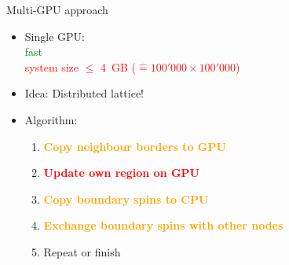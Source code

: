 \documentclass{beamer}
\begin{document}
\begin{frame}{Multi-GPU approach}
\begin{itemize}
    \item Single GPU:\\
        \textcolor{green}{fast}\\ \pause
        \textcolor{red}{system size $\le$ 4~GB ($\mathrel{\widehat{=}} 100'000 \times 100'000$)} \pause
    \item Idea: Distributed lattice! \pause
    \item Algorithm:
        \begin{enumerate}
            \item \textcolor{orange}{\textbf{Copy neighbour borders to GPU}} \pause
            \item \textcolor{red}{\textbf{Update own region on GPU}} \pause
            \item \textcolor{orange}{\textbf{Copy boundary spins to CPU}} \pause
            \item \textcolor{orange}{\textbf{Exchange boundary spins with other nodes}} \pause
            \item Repeat or finish
        \end{enumerate}
\end{itemize}
\end{frame}
\end{document}
